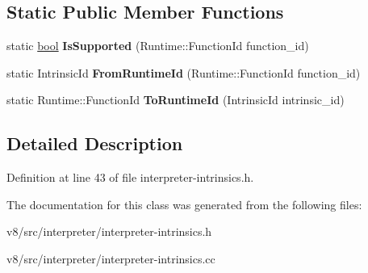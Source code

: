 \subsection*{Static Public Member Functions}
\begin{DoxyCompactItemize}
\item 
\mbox{\label{classv8_1_1internal_1_1interpreter_1_1IntrinsicsHelper_a9d10da91c4a901f5184cee8b9896792a}} 
static \mbox{\hyperlink{classbool}{bool}} {\bfseries Is\+Supported} (Runtime\+::\+Function\+Id function\+\_\+id)
\item 
\mbox{\label{classv8_1_1internal_1_1interpreter_1_1IntrinsicsHelper_afa71b72e57fda6e59bde6506b291da18}} 
static Intrinsic\+Id {\bfseries From\+Runtime\+Id} (Runtime\+::\+Function\+Id function\+\_\+id)
\item 
\mbox{\label{classv8_1_1internal_1_1interpreter_1_1IntrinsicsHelper_a2cb54520d323fc22fa0b563d05d7ffef}} 
static Runtime\+::\+Function\+Id {\bfseries To\+Runtime\+Id} (Intrinsic\+Id intrinsic\+\_\+id)
\end{DoxyCompactItemize}


\subsection{Detailed Description}


Definition at line 43 of file interpreter-\/intrinsics.\+h.



The documentation for this class was generated from the following files\+:\begin{DoxyCompactItemize}
\item 
v8/src/interpreter/interpreter-\/intrinsics.\+h\item 
v8/src/interpreter/interpreter-\/intrinsics.\+cc\end{DoxyCompactItemize}
